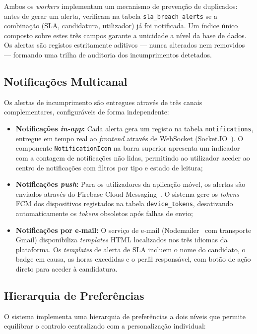 \documentclass[12pt,a4paper]{report}
\begin{document}
Ambos os \textit{workers} implementam um mecanismo de prevenção de duplicados: antes de gerar um alerta, verificam na tabela \texttt{sla\_breach\_alerts} se a combinação (SLA, candidatura, utilizador) já foi notificada. Um índice único composto sobre estes três campos garante a unicidade a nível da base de dados. Os alertas são registos estritamente aditivos --- nunca alterados nem removidos --- formando uma trilha de auditoria dos incumprimentos detetados.

\subsection{Notificações Multicanal}

Os alertas de incumprimento são entregues através de três canais complementares, configuráveis de forma independente:

\begin{itemize}
  \item \textbf{Notificações \textit{in-app}:} Cada alerta gera um registo na tabela \texttt{notifications}, entregue em tempo real ao \textit{frontend} através de WebSocket (Socket.IO~\cite{socketio}). O componente \texttt{NotificationIcon} na barra superior apresenta um indicador com a contagem de notificações não lidas, permitindo ao utilizador aceder ao centro de notificações com filtros por tipo e estado de leitura;
  \item \textbf{Notificações \textit{push}:} Para os utilizadores da aplicação móvel, os alertas são enviados através do Firebase Cloud Messaging~\cite{firebase}. O sistema gere os \textit{tokens} FCM dos dispositivos registados na tabela \texttt{device\_tokens}, desativando automaticamente os \textit{tokens} obsoletos após falhas de envio;
  \item \textbf{Notificações por e-mail:} O serviço de e-mail (Nodemailer~\cite{nodemailer} com transporte Gmail) disponibiliza \textit{templates} HTML localizados nos três idiomas da plataforma. Os \textit{templates} de alerta de SLA incluem o nome do candidato, o badge em causa, as horas excedidas e o perfil responsável, com botão de ação direto para aceder à candidatura.
\end{itemize}

\subsection{Hierarquia de Preferências}

O sistema implementa uma hierarquia de preferências a dois níveis que permite equilibrar o controlo centralizado com a personalização individual:
\end{document}
